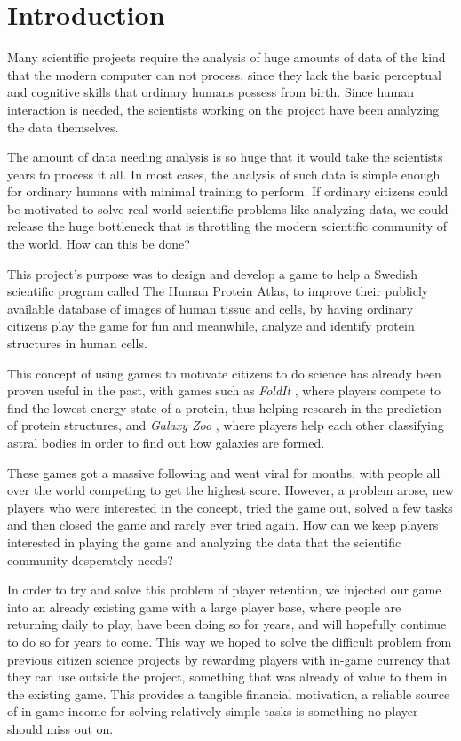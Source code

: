 \section{Introduction}\label{sec:introduction}

Many scientific projects require the analysis of huge amounts of data of the kind that the modern computer can not process, since they lack the basic perceptual and cognitive skills that ordinary humans possess from birth. Since human interaction is needed, the scientists working on the project have been analyzing the data themselves.

The amount of data needing analysis is so huge that it would take the scientists years to process it all. In most cases, the analysis of such data is simple enough for ordinary humans with minimal training to perform. If ordinary citizens could be motivated to solve real world scientific problems like analyzing data, we could release the huge bottleneck that is throttling the modern scientific community of the world. How can this be done?

This project's purpose was to design and develop a game to help a Swedish scientific program called The Human Protein Atlas, to improve their publicly available database of images of human tissue and cells, by having ordinary citizens play the game for fun and meanwhile, analyze and identify protein structures in human cells.

This concept of using games to motivate citizens to do science has already been proven useful in the past, with games such as \emph{FoldIt} \cite{foldit}, where players compete to find the lowest energy state of a protein, thus helping research in the prediction of protein structures, and \emph{Galaxy Zoo} \cite{galaxyzoo}, where players help each other classifying astral bodies in order to find out how galaxies are formed.

These games got a massive following and went viral for months, with people all over the world competing to get the highest score. However, a problem arose, new players who were interested in the concept, tried the game out, solved a few tasks and then closed the game and rarely ever tried again. How can we keep players interested in playing the game and analyzing the data that the scientific community desperately needs?

In order to try and solve this problem of player retention, we injected our game into an already existing game with a large player base, where people are returning daily to play, have been doing so for years, and will hopefully continue to do so for years to come. This way we hoped to solve the difficult problem from previous citizen science projects by rewarding players with in-game currency that they can use outside the project, something that was already of value to them in the existing game. This provides a tangible financial motivation, a reliable source of in-game income for solving relatively simple tasks is something no player should miss out on.

